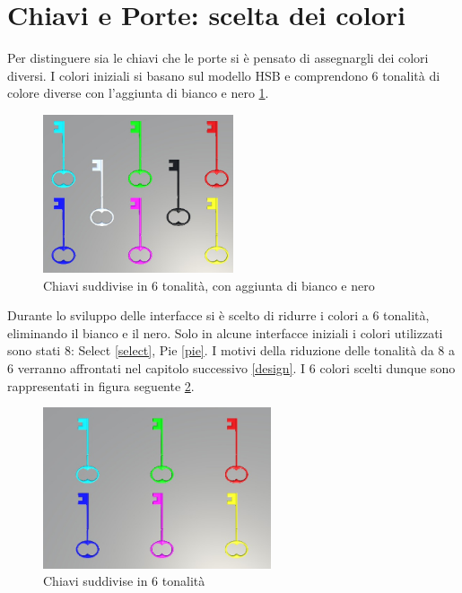 \documentclass[target=bach,aauheader=]{thud}
\begin{document}
\section{Chiavi e Porte: scelta dei colori}
\label{keys}
Per distinguere sia le chiavi che le porte si è pensato di assegnargli dei colori diversi.
I colori iniziali si basano sul modello HSB e comprendono 6 tonalità di colore diverse con l'aggiunta di bianco e nero \ref{fig:keys2}.

\begin{figure}[h]
    \centering
    \includegraphics[width=0.50\textwidth]{keys2}
    \caption{Chiavi suddivise in 6 tonalità, con aggiunta di bianco e nero}
    \label{fig:keys2}
\end{figure}
Durante lo sviluppo delle interfacce si è scelto di ridurre i colori a 6 tonalità, eliminando il bianco e il nero.
Solo in alcune interfacce iniziali i colori utilizzati sono stati 8: Select \ref{select}, Pie \ref{pie}. %
I motivi della riduzione delle tonalità da 8 a 6 verranno affrontati nel capitolo successivo \ref{design}. %
I 6 colori scelti dunque sono rappresentati in figura seguente \ref{fig:keys}.

\begin{figure}[h]
    \centering
    \includegraphics[width=0.60\textwidth]{keys}
    \caption{Chiavi suddivise in 6 tonalità}
    \label{fig:keys}
\end{figure}
\end{document}
